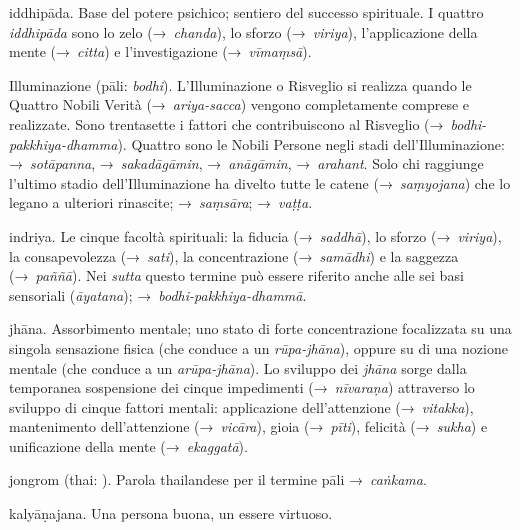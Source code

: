 \begin{glossarydescription}

\item[iddhipāda.]\label{glossary-iddhipada} Base del potere psichico; sentiero del
  successo spirituale. I quattro \emph{iddhipāda} sono lo zelo
  (→~\emph{chanda}), lo sforzo (→~\emph{viriya}), l'applicazione della mente
  (→~\emph{citta}) e l'investigazione (→~\emph{vīmaṃsā}).

\item[Illuminazione] (pāli: \emph{bodhi}). L'Illuminazione o Risveglio si
  realizza quando le Quattro Nobili Verità (→~\emph{ariya-sacca}) vengono
  completamente comprese e realizzate. Sono trentasette i fattori che
  contribuiscono al Risveglio (→~\emph{bodhi-pakkhiya-dhamma}). Quattro sono le
  Nobili Persone negli stadi dell'Illuminazione: →~\emph{sotāpanna},
  →~\emph{sakadāgāmin}, →~\emph{anāgāmin}, →~\emph{arahant}. Solo chi raggiunge
  l'ultimo stadio dell'Illuminazione ha divelto tutte le catene
  (→~\emph{saṃyojana}) che lo legano a ulteriori rinascite; →~\emph{saṃsāra};
  →~\emph{vaṭṭa}.

\item[indriya.] Le cinque facoltà spirituali: la fiducia
  (→~\emph{saddhā}), lo sforzo (→~\emph{viriya}), la consapevolezza
  (→~\emph{sati}), la concentrazione (→~\emph{samādhi}) e la saggezza
  (→~\emph{paññā}). Nei \emph{sutta} questo termine può essere riferito anche
  alle sei basi sensoriali (\emph{āyatana}); →~\emph{bodhi-pakkhiya-dhammā}.


\item[jhāna.] Assorbimento mentale; uno stato di forte concentrazione
  focalizzata su una singola sensazione fisica (che conduce a un
  \emph{rūpa-jhāna}), oppure su di una nozione mentale (che conduce a un
  \emph{arūpa-jhāna}). Lo sviluppo dei \emph{jhāna} sorge dalla temporanea
  sospensione dei cinque impedimenti (→~\emph{nīvaraṇa}) attraverso lo sviluppo
  di cinque fattori mentali: applicazione dell'attenzione (→~\emph{vitakka}),
  mantenimento dell'attenzione (→~\emph{vicāra}), gioia (→~\emph{pīti}),
  felicità (→~\emph{sukha}) e unificazione della mente (→~\emph{ekaggatā}).

\item[jongrom] (thai: ). Parola thailandese per il termine
  pāli →~\emph{caṅkama}.


\item[kalyāṇajana.] Una persona buona, un essere virtuoso.


\end{glossarydescription}
